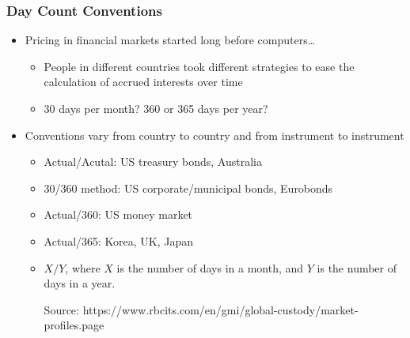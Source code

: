 \documentclass[10pt]{beamer}
\begin{document}
	
	\begin{frame}
		\frametitle{Day Count Conventions}
		
		\begin{itemize}
			\item Pricing in financial markets started long before computers…
			
			\begin{itemize}
				\item People in different countries took different strategies to ease the calculation of accrued interests over time
				\item 30 days per month? 360 or 365 days per year?
			\end{itemize}		
			
			\item Conventions vary from country to country and from instrument to instrument
			\begin{itemize}
				\item Actual/Acutal: US treasury bonds, Australia
				\item 30/360 method: US corporate/municipal bonds, Eurobonds
				\item Actual/360: US money market 
				\item Actual/365: Korea, UK, Japan \vspace{10pt}
				\item $ X/Y $, where $X$ is the number of days in a month, and $Y$ is the number of days in a year.
				
				{\scriptsize Source: https://www.rbcits.com/en/gmi/global-custody/market-profiles.page}
				
			\end{itemize}
			
			
		\end{itemize}		
		
	\end{frame}
	
	
	
\end{document}
